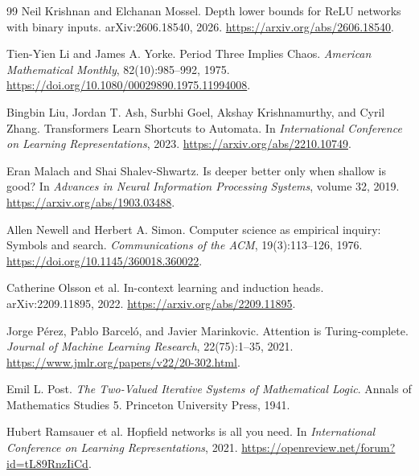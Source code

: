 \documentclass[11pt,twoside]{article}
\theoremstyle{definition}
\theoremstyle{remark}
\begin{document}
\begin{thebibliography}{99}
Neil Krishnan and Elchanan Mossel.
\newblock Depth lower bounds for ReLU networks with binary inputs.
\newblock arXiv:2606.18540, 2026.
\newblock \url{https://arxiv.org/abs/2606.18540}.

Tien-Yien Li and James A. Yorke.
\newblock Period Three Implies Chaos.
\newblock \emph{American Mathematical Monthly}, 82(10):985--992, 1975.
\newblock \url{https://doi.org/10.1080/00029890.1975.11994008}.

Bingbin Liu, Jordan T. Ash, Surbhi Goel, Akshay Krishnamurthy, and Cyril Zhang.
\newblock Transformers Learn Shortcuts to Automata.
\newblock In \emph{International Conference on Learning Representations}, 2023.
\newblock \url{https://arxiv.org/abs/2210.10749}.

Eran Malach and Shai Shalev-Shwartz.
\newblock Is deeper better only when shallow is good?
\newblock In \emph{Advances in Neural Information Processing Systems},
volume 32, 2019.
\newblock \url{https://arxiv.org/abs/1903.03488}.

Allen Newell and Herbert A. Simon.
\newblock Computer science as empirical inquiry: Symbols and search.
\newblock \emph{Communications of the ACM}, 19(3):113--126, 1976.
\newblock \url{https://doi.org/10.1145/360018.360022}.

Catherine Olsson et al.
\newblock In-context learning and induction heads.
\newblock arXiv:2209.11895, 2022.
\newblock \url{https://arxiv.org/abs/2209.11895}.

Jorge P\'erez, Pablo Barcel\'o, and Javier Marinkovic.
\newblock Attention is Turing-complete.
\newblock \emph{Journal of Machine Learning Research}, 22(75):1--35, 2021.
\newblock \url{https://www.jmlr.org/papers/v22/20-302.html}.

Emil L. Post.
\newblock \emph{The Two-Valued Iterative Systems of Mathematical Logic}.
\newblock Annals of Mathematics Studies 5. Princeton University Press, 1941.

Hubert Ramsauer et al.
\newblock Hopfield networks is all you need.
\newblock In \emph{International Conference on Learning Representations},
2021.
\newblock \url{https://openreview.net/forum?id=tL89RnzIiCd}.


\end{thebibliography}
\end{document}
